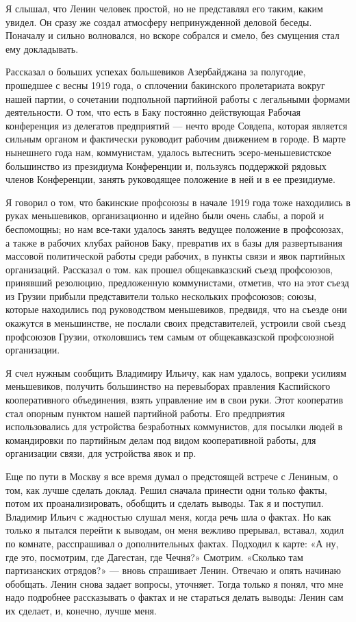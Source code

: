 \documentclass[12pt, a4paper, openany]{book}
\begin{document}
Я слышал, что Ленин человек простой, но не представлял его таким, каким увидел. Он сразу же создал атмосферу непринужденной деловой беседы. Поначалу и сильно волновался, но вскоре собрался и смело, без смущения стал ему докладывать.

Рассказал о больших успехах большевиков Азербайджана за полугодие, прошедшее с весны 1919 года, о сплочении бакинского пролетариата вокруг нашей партии, о сочетании подпольной партийной работы с легальными формами деятельности. О том, что есть в Баку постоянно действующая Рабочая конференция из делегатов предприятий — нечто вроде Совдепа, которая является сильным органом и фактически руководит рабочим движением в городе. В марте нынешнего года нам, коммунистам, удалось вытеснить эсеро-меньшевистское большинство из президиума Конференции и, пользуясь поддержкой рядовых членов Конференции, занять руководящее положение в ней и в ее президиуме.

Я говорил о том, что бакинские профсоюзы в начале 1919 года тоже находились в руках меньшевиков, организационно и идейно были очень слабы, а порой и беспомощны; но нам все-таки удалось занять ведущее положение в профсоюзах, а также в рабочих клубах районов Баку, превратив их в базы для развертывания массовой политической работы среди рабочих, в пункты связи и явок партийных организаций. Рассказал о том. как прошел общекавказский съезд профсоюзов, принявший резолюцию, предложенную коммунистами, отметив, что на этот съезд из Грузии прибыли представители только нескольких профсоюзов; союзы, которые находились под руководством меньшевиков, предвидя, что на съезде они окажутся в меньшинстве, не послали своих представителей, устроили свой съезд профсоюзов Грузии, отколовшись тем самым от общекавказской профсоюзной организации.

Я счел нужным сообщить Владимиру Ильичу, как нам удалось, вопреки усилиям меньшевиков, получить большинство на перевыборах правления Каспийского кооперативного объединения, взять управление им в свои руки. Этот кооператив стал опорным пунктом нашей партийной работы. Его предприятия использовались для устройства безработных коммунистов, для посылки людей в командировки по партийным делам под видом кооперативной работы, для организации связи, для устройства явок и пр.

Еще по пути в Москву я все время думал о предстоящей встрече с Лениным, о том, как лучше сделать доклад. Решил сначала принести одни только факты, потом их проанализировать, обобщить и сделать выводы. Так я и поступил. Владимир Ильич с жадностью слушал меня, когда речь шла о фактах. Но как только я пытался перейти к выводам, он меня вежливо прерывал, вставал, ходил по комнате, расспрашивал о дополнительных фактах. Подходил к карте: «А ну, где это, посмотрим, где Дагестан, где Чечня?» Смотрим. «Сколько там партизанских отрядов?» — вновь спрашивает Ленин. Отвечаю и опять начинаю обобщать. Ленин снова задает вопросы, уточняет. Тогда только я понял, что мне надо подробнее рассказывать о фактах и не стараться делать выводы: Ленин сам их сделает, и, конечно, лучше меня.
\end{document}
